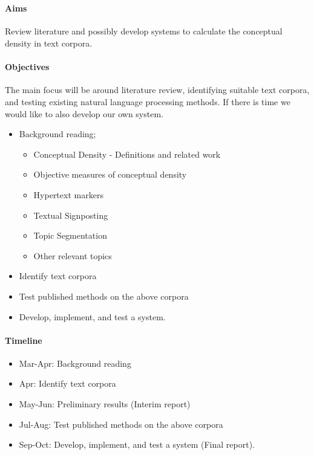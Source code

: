 \documentclass[12pt]{article}
\begin{document}
 \\

\paragraph{Aims}
Review literature and possibly develop systems to calculate the conceptual density in text corpora.

\paragraph{Objectives}
The main focus will be around literature review, identifying suitable text corpora, and testing existing natural language processing methods. If there is time we would like to also develop our own system.
\begin{itemize}[noitemsep]
\item Background reading; 

	\begin{itemize}[noitemsep]
		\item Conceptual Density - Definitions and related work
		\item Objective measures of conceptual density
		\item Hypertext markers
		\item Textual Signposting
		\item Topic Segmentation
		\item Other relevant topics
	\end{itemize}

\item Identify text corpora
\item Test published methods on the above corpora
\item Develop, implement, and test a system.
\end{itemize}

\paragraph{Timeline} 
\begin{itemize}[noitemsep]
\item Mar-Apr: Background reading
\item Apr: Identify text corpora
\item May-Jun: Preliminary results (Interim report)
\item Jul-Aug: Test published methods on the above corpora
\item Sep-Oct: Develop, implement, and test a system (Final report).
\end{itemize}
\end{document}
